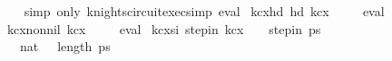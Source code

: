 \begin{isabellebody}
%
\isadelimproof
\ \ %
\endisadelimproof
%
\isatagproof
{}\isamarkupfalse%
\ {\isacharparenleft}{\kern0pt}simp\ only{\isacharcolon}{\kern0pt}\ knights{\isacharunderscore}{\kern0pt}circuit{\isacharunderscore}{\kern0pt}exec{\isacharunderscore}{\kern0pt}simp{\isacharparenright}{\kern0pt}\ eval%
\endisatagproof
{\isafoldproof}%
%
\isadelimproof
\isanewline
%
\endisadelimproof
\isanewline
{}\isamarkupfalse%
\ kc{\isacharunderscore}{\kern0pt}{}x{}{\isacharunderscore}{\kern0pt}hd{\isacharcolon}{\kern0pt}\ {\isachardoublequoteopen}hd\ kc{}x{}\ {\isacharequal}{\kern0pt}\ {\isacharparenleft}{\kern0pt}{}{\isacharcomma}{\kern0pt}{}{\isacharparenright}{\kern0pt}{\isachardoublequoteclose}%
\isadelimproof
\ %
\endisadelimproof
%
\isatagproof
{}\isamarkupfalse%
\ eval%
\endisatagproof
{\isafoldproof}%
%
\isadelimproof
%
\endisadelimproof
\isanewline
\isanewline
{}\isamarkupfalse%
\ kc{\isacharunderscore}{\kern0pt}{}x{}{\isacharunderscore}{\kern0pt}non{\isacharunderscore}{\kern0pt}nil{\isacharcolon}{\kern0pt}\ {\isachardoublequoteopen}kc{}x{}\ {\isasymnoteq}\ {\isacharbrackleft}{\kern0pt}{\isacharbrackright}{\kern0pt}{\isachardoublequoteclose}%
\isadelimproof
\ %
\endisadelimproof
%
\isatagproof
{}\isamarkupfalse%
\ eval%
\endisatagproof
{\isafoldproof}%
%
\isadelimproof
%
\endisadelimproof
\isanewline
\isanewline
{}\isamarkupfalse%
\ kc{\isacharunderscore}{\kern0pt}{}x{}{\isacharunderscore}{\kern0pt}si{\isacharcolon}{\kern0pt}\ {\isachardoublequoteopen}step{\isacharunderscore}{\kern0pt}in\ kc{}x{}\ {\isacharparenleft}{\kern0pt}{}{\isacharcomma}{\kern0pt}{}{\isacharparenright}{\kern0pt}\ {\isacharparenleft}{\kern0pt}{}{\isacharcomma}{\kern0pt}{}{\isacharparenright}{\kern0pt}{\isachardoublequoteclose}\ {\isacharparenleft}{\kern0pt}\ {\isachardoublequoteopen}step{\isacharunderscore}{\kern0pt}in\ {\isacharquery}{\kern0pt}ps\ {\isacharunderscore}{\kern0pt}\ {\isacharunderscore}{\kern0pt}{\isachardoublequoteclose}{\isacharparenright}{\kern0pt}\isanewline
%
\isadelimproof
%
\endisadelimproof
%
\isatagproof
{}\isamarkupfalse%
\ {\isacharminus}{\kern0pt}\isanewline
\ \ \isamarkupfalse%
\ {\isachardoublequoteopen}{}\ {\isacharless}{\kern0pt}\ {\isacharparenleft}{\kern0pt}{}{\isacharcolon}{\kern0pt}{\isacharcolon}{\kern0pt}nat{\isacharparenright}{\kern0pt}{\isachardoublequoteclose}\ {\isachardoublequoteopen}{}\ {\isacharless}{\kern0pt}\ length\ {\isacharquery}{\kern0pt}ps{\isachardoublequoteclose}\ \isanewline

\end{isabellebody}
